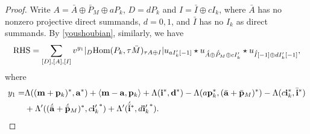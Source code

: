 \documentclass[reqno,12pt]{amsart}
\numberwithin{equation}{section}
\def\lr#1{\langle #1\rangle} \def\fin{\hfill$\square$}  \def\lra{\longrightarrow} \def\mod{\mbox{\rm \textbf{mod}}\,}\def\Mod{\mbox{\rm mod}\,}\def\top{\mbox{\rm top}\,}\def\soc{\mbox{\rm soc}\,}
\theoremstyle{plain} %
\theoremstyle{definition} %
\begin{document}
\begin{proof}
Write $A=\bar{A}\oplus \bar{P}_M\oplus aP_k$, $D=dP_k$ and $I=\bar{I}\oplus cI_k$, where $\bar{A}$ has no nonzero projective direct summands, $d=0,1$, and $\bar{I}$ has no $I_k$ as direct summands. By \eqref{youshoubian}, similarly, we have
\begin{align}\label{youshoubian2}
{\rm RHS}=\sum_{[D],[A],[I]}v^{y_1}|_D\mbox{\rm Hom}(P_k,\tau \bar{M})_{\tau A\oplus I}|u_{aI_k'[-1]}\star u_{\acute{\bar{A}}\oplus \acute{\bar{P}}_M\oplus cI_k'}\star u_{\acute{\bar{I}}[-1]\oplus dI_k'[-1]},
\end{align}
where
\begin{align*}
y_1=&\Lambda(({\bf m}+{\bf p}_k)^\ast, {\bf a}^\ast)+\lr{{\bf m}-{\bf a},{\bf p}_k}+\Lambda({\bf i}^\ast,{\bf d}^\ast)-\Lambda(a{\bf p}_k^\ast,(\bar{\bf a}+\bar{\bf p}_M)^\ast)-\Lambda(c{\bf i}_k^\ast,\bar{\bf i}^\ast)\\
&+\Lambda'((\acute{\bar{\mathbf{a}}}+\acute{\bar{\mathbf{p}}}_M)^\ast,c{{\bf i}_k'}^\ast)+\Lambda'(\acute{\bar{\mathbf{i} }}^\ast,d{{\bf i}_k'}^\ast).
\end{align*}


\end{proof}
\end{document}
